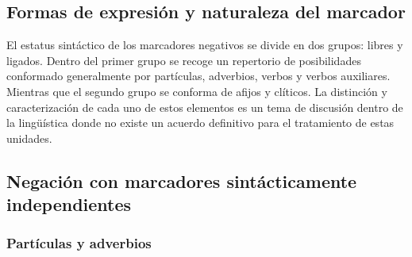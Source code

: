 \subsection*{Formas de expresión y naturaleza del marcador}

\noindent  El estatus sintáctico de los marcadores negativos se divide en dos grupos: libres y ligados. Dentro del primer grupo se recoge un repertorio de posibilidades conformado generalmente por partículas, adverbios, verbos y verbos auxiliares. Mientras que el segundo grupo se conforma de afijos y clíticos. La distinción y caracterización de cada uno de estos elementos es un tema de discusión dentro de la lingüística donde no existe un acuerdo definitivo para el tratamiento de estas unidades.

\subsection*{Negación con marcadores sintácticamente independientes}

\subsubsection*{Partículas y adverbios}



